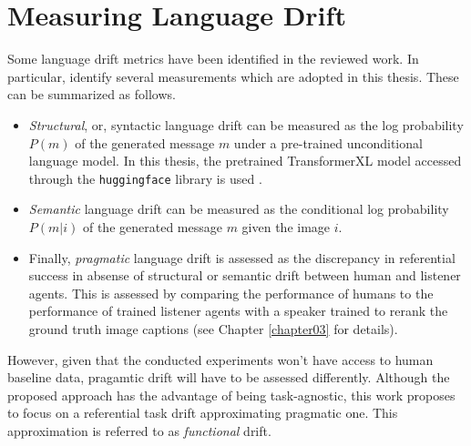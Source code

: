 \section{Measuring Language Drift}

Some language drift metrics have been identified in the reviewed work. In particular, \cite{lazaridou2020multi} identify several measurements which are adopted in this thesis. These can be summarized as follows. 
\begin{itemize}
	\item \textit{Structural}, or, syntactic language drift can be measured as the log probability $P(m)$ of the generated message $m$ under a pre-trained unconditional language model. In this thesis, the pretrained TransformerXL model accessed through the \texttt{huggingface} library is used \parencite{dai2019transformer, wolf2019huggingface}.
	\item \textit{Semantic} language drift can be measured as the conditional log probability $P(m|i)$ of the generated message $m$ given the image $i$. %
	\item Finally, \textit{pragmatic} language drift is assessed as the discrepancy in referential success in absense of structural or semantic drift between human and listener agents. This is assessed by comparing the performance of humans to the performance of trained listener agents with a speaker trained to rerank the ground truth image captions (see Chapter \ref{chapter03} for details). 
\end{itemize}

However, given that the conducted experiments won't have access to human baseline data, pragamtic drift will have to be assessed differently. Although the proposed approach has the advantage of being task-agnostic, this work proposes to focus on a referential task drift approximating pragmatic one. This approximation is referred to as \textit{functional} drift. 

